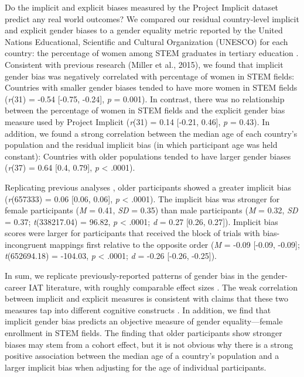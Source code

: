 \documentclass[9pt,twocolumn,twoside,lineno]{pnas-new}
\begin{document}
Do the implicit and explicit biases measured by the Project Implicit
dataset predict any real world outcomes? We compared our residual
country-level implicit and explicit gender biases to a gender equality
metric reported by the United Nations Educational, Scientific and
Cultural Organization (UNESCO) for each country: the percentage of women
among STEM graduates in tertiary education  \cite{miller2015women,stoet2018gender}.  Consistent with previous research
(Miller et al., 2015), we found that implicit gender bias was negatively
correlated with percentage of women in STEM fields: Countries with
smaller gender biases tended to have more women in STEM fields (\emph{r}(31) = -0.54 {[}-0.75, -0.24{]}, \emph{p} = 0.001). In contrast, there was no
relationship between the percentage of women in STEM fields and the
explicit gender bias measure used by Project Implicit (\emph{r}(31) = 0.14 {[}-0.21, 0.46{]}, \emph{p} = 0.43). In addition, we found a strong correlation between the
median age of each country's population \cite{ciafactbook} and the residual implicit bias (in which participant age
was held constant): Countries with older populations tended to have
larger gender biases (\emph{r}(37) = 0.64 {[}0.4, 0.79{]}, \emph{p} \textless{} .0001).


Replicating previous analyses \cite{nosek2002harvesting}, older participants showed a greater implicit bias  (\emph{r}(657333) = 0.06 {[}0.06, 0.06{]}, \emph{p} \textless{} .0001).  The implicit bias was stronger for female participants (\emph{M} = 0.41, \emph{SD} = 0.35)  than male participants
(\emph{M} = 0.32, \emph{SD} = 0.37; \emph{t}(338217.04) = 96.82, \emph{p} \textless{} .0001; \emph{d} = 0.27 {[}0.26, 0.27{]}). Implicit bias scores were larger for participants that received the block of trials with bias-incongruent mappings first
relative to the opposite order (\emph{M} = -0.09 {[}-0.09, -0.09{]}; \emph{t}(652694.18) = -104.03, \emph{p} \textless{} .0001; \emph{d} = -0.26 {[}-0.26, -0.25{]}).

In sum, we replicate previously-reported patterns of gender bias in the
gender-career IAT literature, with roughly comparable effect sizes \citep[c.f.][]{nosek2002harvesting}.
The weak correlation between implicit and
explicit measures is consistent with claims that these two measures tap
into different cognitive constructs \cite{forscher2016meta}. In
addition, we find that implicit gender bias predicts an objective measure of gender equality---female enrollment in STEM fields. The
finding that older participants show stronger biases may stem from a
cohort effect, but it is not obvious why there is a strong positive
association between the median age of a country's population and a
larger implicit bias when adjusting for the age of individual
participants.
\end{document}
